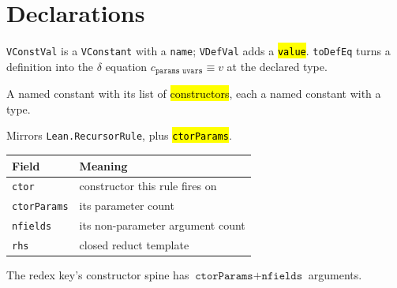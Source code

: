 \section{Declarations}

\begin{definition}
\label{def:vconstval}
\leanok
{}

 \texttt{VConstVal} is a \texttt{VConstant} with a \texttt{name};
\texttt{VDefVal} adds a \hl{\texttt{value}}.
\texttt{toDefEq} turns a definition into the $\delta$ equation
$c_{\texttt{params uvars}} \equiv v$ at the declared type.
\end{definition}

\begin{definition}
\label{struct:vinductivetype}
\leanok
{}

 A named constant with its list of \hl{constructors}, each a named
constant with a type.
\end{definition}

\begin{definition}
\label{struct:vrecrule}
\leanok
{} 

 Mirrors \texttt{Lean.RecursorRule}, plus \hl{\texttt{ctorParams}}.
\par\smallskip\noindent
\begin{tabular}{ll}
\toprule
Field & Meaning \\
\midrule
\texttt{ctor} & constructor this rule fires on \\
\texttt{ctorParams} & its parameter count \\
\texttt{nfields} & its non-parameter argument count \\
\texttt{rhs} & closed reduct template \\
\bottomrule
\end{tabular}\par\smallskip
The redex key's constructor spine has $\texttt{ctorParams}+\texttt{nfields}$
arguments.
\end{definition}

